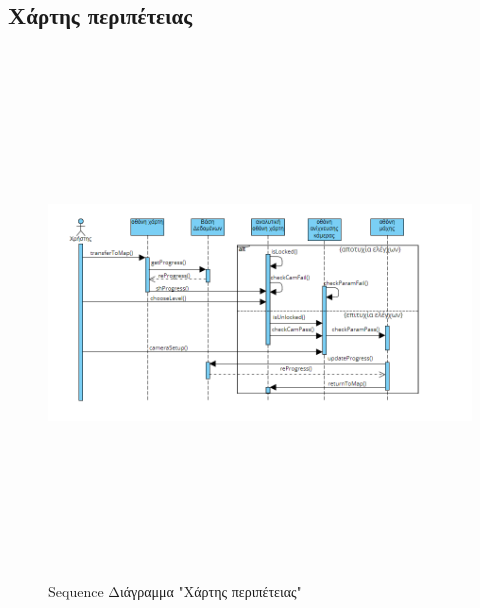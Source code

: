 \subsection{Χάρτης περιπέτειας}
\begin{figure}[!htb]
    \begin{center}
    \includegraphics[width=\textwidth,height=14cm]{sequence_map.png}
    \caption{Sequence Διάγραμμα "Χάρτης περιπέτειας"}
    \label{}
    \end{center}
\end{figure}
\newpage

